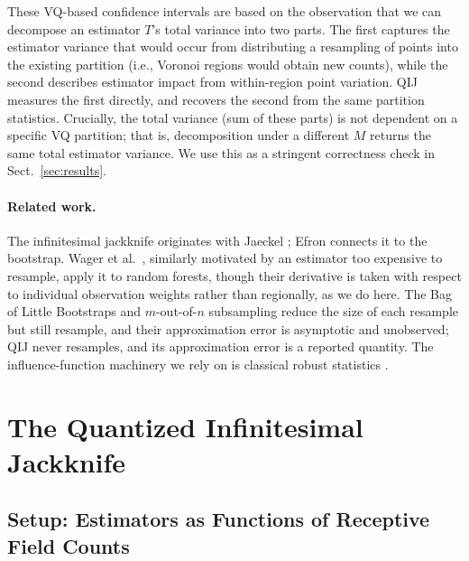 \documentclass[runningheads]{llncs}
\begin{document}
These VQ-based confidence intervals are based on the observation that we can decompose an estimator $T$'s total variance into two parts. The first captures the estimator variance that would occur from distributing a resampling of points into the existing partition (i.e., Voronoi regions would obtain new counts), while the second describes estimator impact from within-region point variation. QIJ measures the first directly, and recovers the second from the same partition statistics. Crucially, the total variance (sum of these parts) is not dependent on a specific VQ partition; that is, decomposition under a different $M$ returns the same total estimator variance. We use this as a stringent correctness check in Sect.~\ref{sec:results}.

\paragraph{Related work.} The infinitesimal jackknife originates with Jaeckel \cite{jaeckel1972}; Efron \cite{efron1982} connects it to the bootstrap. Wager et al.\ \cite{wager2014}, similarly motivated by an estimator too expensive to resample, apply it to random forests, though their derivative is taken with respect to individual observation weights rather than regionally, as we do here. The Bag of Little Bootstraps \cite{kleiner2014} and $m$-out-of-$n$ subsampling \cite{bickel1997} reduce the size of each resample but still resample, and their approximation error is asymptotic and unobserved; QIJ never resamples, and its approximation error is a reported quantity. The influence-function machinery we rely on is classical robust statistics \cite{hampel1974,stefanski2002}.


\section{The Quantized Infinitesimal Jackknife}\label{sec:method}

\subsection{Setup: Estimators as Functions of Receptive Field Counts}\label{sec:setup}
\end{document}
